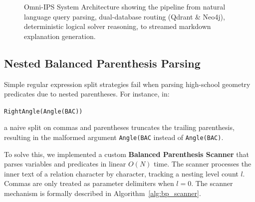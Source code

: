 \begin{figure}[p]
    \caption{Omni-IPS System Architecture showing the pipeline from natural language query parsing, dual-database routing (Qdrant \& Neo4j), deterministic logical solver reasoning, to streamed markdown explanation generation.}
    \label{fig:architecture}
\end{figure}

\subsection{Nested Balanced Parenthesis Parsing}
Simple regular expression split strategies fail when parsing high-school geometry predicates due to nested parentheses. For instance, in:
\begin{center}
    \texttt{RightAngle(Angle(BAC))}
\end{center}
a naive split on commas and parentheses truncates the trailing parenthesis, resulting in the malformed argument \texttt{Angle(BAC} instead of \texttt{Angle(BAC)}. 

To solve this, we implemented a custom \textbf{Balanced Parenthesis Scanner} that parses variables and predicates in linear $O(N)$ time. The scanner processes the inner text of a relation character by character, tracking a nesting level count $l$. Commas are only treated as parameter delimiters when $l = 0$. The scanner mechanism is formally described in Algorithm~\ref{alg:bp_scanner}.

